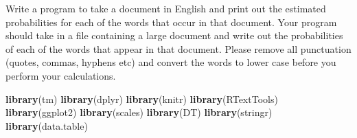 \documentclass[]{article}
\newenvironment{Shaded}{\begin{snugshade}}{\end{snugshade}}
\newcommand{\KeywordTok}[1]{\textcolor[rgb]{0.13,0.29,0.53}{\textbf{{#1}}}}
\newcommand{\NormalTok}[1]{{#1}}
\begin{document}
Write a program to take a document in English and print out the
estimated probabilities for each of the words that occur in that
document. Your program should take in a file containing a large document
and write out the probabilities of each of the words that appear in that
document. Please remove all punctuation (quotes, commas, hyphens etc)
and convert the words to lower case before you perform your
calculations.

\begin{Shaded}
\begin{Highlighting}[]
\KeywordTok{library}\NormalTok{(tm)}
\KeywordTok{library}\NormalTok{(dplyr)}
\KeywordTok{library}\NormalTok{(knitr)}
\KeywordTok{library}\NormalTok{(RTextTools)}
\KeywordTok{library}\NormalTok{(ggplot2)}
\KeywordTok{library}\NormalTok{(scales)}
\KeywordTok{library}\NormalTok{(DT)}
\KeywordTok{library}\NormalTok{(stringr)}
\KeywordTok{library}\NormalTok{(data.table)}
\end{Highlighting}
\end{Shaded}
\end{document}
